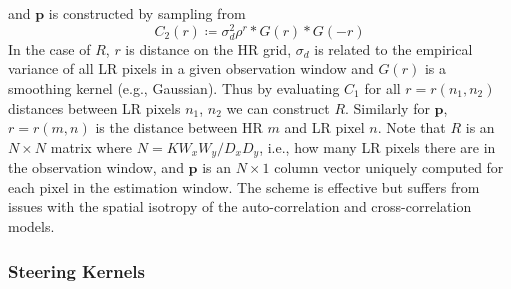 and \(\bm{p}\) is constructed by sampling from
\begin{equation}
    C_2(r) \coloneqq \sigma_d^2 \rho^{r} \ast G(r) \ast G(-r)
\end{equation}
In the case of \(R\), \(r\) is distance on the HR grid, \(\sigma_d\) is related to the empirical variance of all LR pixels in a given observation window and \(G(r)\) is a smoothing kernel (e.g., Gaussian).
%
Thus by evaluating \(C_1\) for all \(r = r(n_1, n_2)\) distances between LR pixels \(n_1\), \(n_2\) we can construct \(R\).
%
Similarly for \(\bm{p}\), \(r = r(m, n)\) is the distance between HR \(m\) and LR pixel \(n\).
%
Note that \(R\) is an \(N \times N\) matrix where \(N = K W_x W_y/D_x D_y\), i.e., how many LR pixels there are in the observation window, and \(\bm{p}\) is an \(N \times 1\) column vector uniquely computed for each pixel in the estimation window.
%
The scheme is effective but suffers from issues with the spatial isotropy of the auto-correlation and cross-correlation models.

\subsubsection{Steering Kernels}

